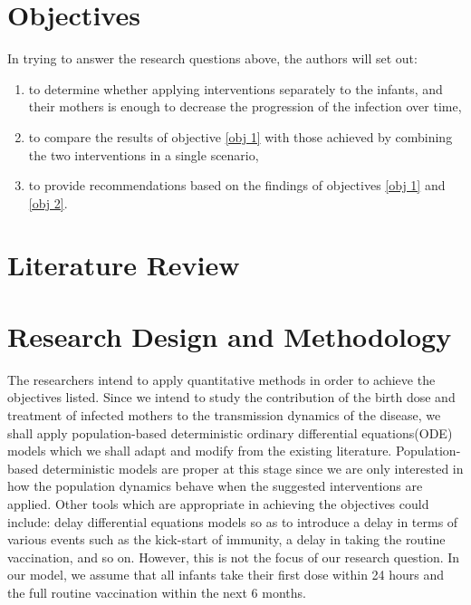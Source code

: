 \documentclass[11pt,a4paper]{article}
\begin{document}
\section{Objectives}
In trying to answer the research questions above, the authors will set out:
	\begin{enumerate}
		\item 	to determine whether applying interventions separately to the infants, and their mothers is enough to decrease the progression of the infection over time, \label{obj 1}
		\item 	 to compare the results of objective \ref{obj 1} with those achieved by combining the two interventions in a single scenario, \label{obj 2}
		\item to provide recommendations based on the findings of objectives \ref{obj 1} and \ref{obj 2}.
		
		
	\end{enumerate}

\section{Literature Review}

\section{Research Design and Methodology}
The researchers intend to apply quantitative methods in order to achieve the objectives listed. Since we intend to study the contribution of the birth dose and treatment of infected mothers to the transmission dynamics of the disease, we shall apply population-based deterministic ordinary differential equations(ODE) models which we shall adapt and modify from the existing literature. Population-based deterministic models are proper at this stage since we are only interested in how the population dynamics behave when the suggested interventions are applied. Other tools which are appropriate in achieving the objectives could include: delay differential equations models so as to introduce a delay in terms of various events such as the kick-start of immunity, a delay in taking the routine vaccination, and so on. However, this is not the focus of our research question. In our model, we assume that all infants take their first dose within 24 hours and the full routine vaccination within the next 6 months. 
\end{document}
